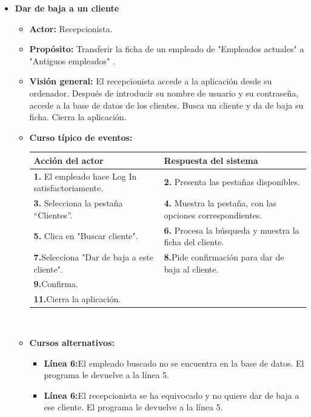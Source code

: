 \documentclass[spanish,a4paper,12pt]{report}		%
\begin{document}
\begin{itemize}
	\item \textbf{Dar de baja a un cliente}
			\begin{itemize}
			\item \textbf{Actor:} Recepcionista.
			\item \textbf{Propósito: } Transferir la ficha de un empleado de "Empleados actuales" a "Antiguos empleados" .
			\item \textbf{Visión general:} El recepcionista accede a la aplicación desde su ordenador. Después de introducir su nombre de usuario y su contraseña, accede a la base de datos de los clientes. Busca un cliente y da de baja su ficha. Cierra la aplicación. 
			\item \textbf{Curso típico de eventos:} 	\\
				\begin{tabular}{|p{6cm}||p{6cm}|}
				\hline
				\textbf{Acción del actor} & \textbf{Respuesta del sistema} \\ \hline \hline
				\textbf{1.}   El empleado hace Log In satisfactoriamente. & \textbf{2.} Presenta las pestañas disponibles.\\ \hline
				\textbf{3.} Selecciona la pestaña “Clientes”. & \textbf{4.} Muestra la pestaña, con las opciones correspondientes. \\ \hline
				\textbf{5.} Clica en "Buscar cliente".	& \textbf{6.} Procesa la búsqueda y muestra la ficha del cliente. \\ \hline
				\textbf{7.}Selecciona "Dar de baja a este cliente". & \textbf{8.}Pide confirmación para dar de baja al cliente.\\ \hline
				\textbf{9.}Confirma. & \textbf{} \\ \hline
				\textbf{11.}Cierra la aplicación. & \textbf{} \\ \hline
			\end{tabular}
			\\
			\item \textbf{Cursos alternativos:} 
			\begin{itemize}
			\item  \textbf{Línea 6:}El empleado buscado no se encuentra en la base de datos. El programa le devuelve a la línea 5.
			\item  \textbf{Línea 6:}El recepcionista se ha equivocado y no quiere dar de baja a ese cliente. El programa le devuelve a la línea 5.
			\end {itemize}
		\end{itemize}%



\end{itemize}
\end{document}
